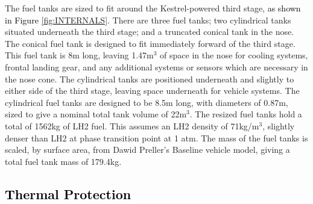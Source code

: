 		

		The fuel tanks are sized to fit around the Kestrel-powered third stage, \textcolor{black}{as shown in Figure \ref{fig:INTERNALS}}. There are three fuel tanks; two cylindrical tanks situated underneath the third stage; and a truncated conical tank in the nose. The conical fuel tank is designed to fit immediately forward of the third stage. This fuel tank is 8m long, leaving 1.47m$^3$ of space in the nose for cooling systems, frontal landing gear, and any additional systems or sensors which are necessary in the nose cone. The cylindrical tanks are positioned underneath and slightly to either side of the third stage, leaving space underneath for vehicle systems. The cylindrical fuel tanks are designed to be 8.5m long, with diameters of 0.87m, sized to give a nominal total tank volume of 22m$^3$.
The resized fuel tanks hold a total of 1562kg of LH2 fuel. This assumes an LH2 density of 71kg/m$^3$, slightly denser than LH2 at phase transition point at 1 atm.
The mass of the fuel tanks is scaled, by surface area, from Dawid Preller's Baseline vehicle model\cite{Preller2017b}, giving a total fuel tank mass of 179.4kg.
		
		\textcolor{black}{
			\subsection{Thermal Protection}\label{sec:therm1}
				}
	
